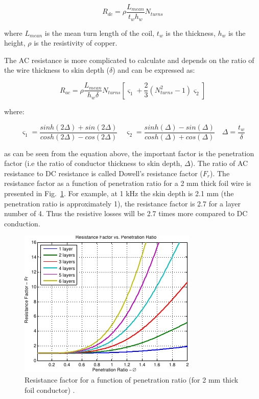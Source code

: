 \documentclass[a4paper, 11pt]{article} %
\begin{document}
\begin{equation}
  R_{dc} = \rho \frac{L_{mean}}{t_w h_w} N_{turns}
\end{equation}

where $L_{mean}$ is the mean turn length of the coil, $t_w$ is the thickness, $h_w$ is the height, $\rho$ is the resistivity of copper.

The AC resistance is more complicated to calculate and depends on the ratio of the wire thickness to skin depth ($\delta$) and can be expressed as:

\begin{equation}
  R_{ac}=\rho \frac{L_{mean}}{h_w \delta} N_{turns} \left[\varsigma_1 + \frac{2}{3} (N_{turns}^2-1)\varsigma_2\right]
  \label{R_ac_foil}
\end{equation}

where:

\begin{equation}
  \varsigma_1 = \dfrac{sinh(2\Delta)+sin(2\Delta)}{cosh(2\Delta)-cos(2\Delta)} \quad
  \varsigma_2 = \dfrac{sinh(\Delta)-sin(\Delta)}{cosh(\Delta)+cos(\Delta)} \quad  
  \Delta = \dfrac{t_w}{\delta}
\end{equation}

as can be seen from the equation above,  the important factor is the penetration factor (i.e the ratio of conductor thickness to skin depth, $\Delta$). The ratio of AC resistance to DC resistance is called Dowell's resistance factor ($F_r$). The resistance factor as a function of penetration ratio for a 2 mm thick foil wire is presented in Fig.~\ref{resistance_factor}. For example, at 1 kHz the skin depth is 2.1 mm (the penetration ratio is approximately 1), the resistance factor is 2.7 for a layer number of 4. Thus the resistive losses will be 2.7 times more compared to DC conduction.

\begin{figure}[]
  \centering
    \includegraphics[scale=1.25]{resistance_factor}
  \caption{Resistance factor for a function of penetration ratio (for 2 mm thick foil conductor) \cite{Villar2010}.}
  \label{resistance_factor}
\end{figure}
\end{document}
